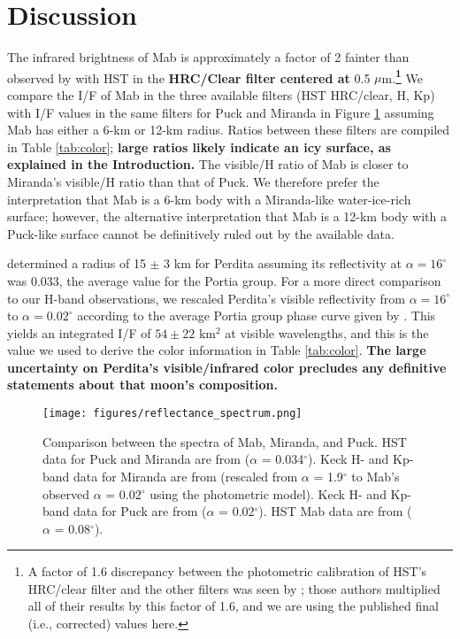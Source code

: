 \documentclass[preprint]{aastex631}
\begin{document}
\section{Discussion}
\label{s:discussion}

The infrared brightness of Mab is approximately a factor of 2 fainter than observed by \citet{showalter06} with HST in the \textbf{HRC/Clear filter centered at} 0.5 $\mu$m.\textbf{\footnote{A factor of 1.6 discrepancy between the photometric calibration of HST's HRC/clear filter and the other filters was seen by \citet{showalter06}; those authors multiplied all of their results by this factor of 1.6, and we are using the published final (i.e., corrected) values here.}} We compare the I/F of Mab in the three available filters (HST HRC/clear, H, Kp) with I/F values in the same filters for Puck and Miranda \citep{karkoschka01, gibbard05, paradis23} in Figure \ref{fig:spectrum} assuming Mab has either a 6-km or 12-km radius. Ratios between these filters are compiled in Table \ref{tab:color}; \textbf{large ratios likely indicate an icy surface, as explained in the Introduction.} 
The visible/H ratio of Mab is 
closer to Miranda's visible/H ratio than that of Puck. We therefore prefer the interpretation that Mab is a 6-km body with a Miranda-like water-ice-rich surface; however, the alternative interpretation that Mab is a 12-km body with a Puck-like surface cannot be definitively ruled out by the available data.


\citet{karkoschka01b} determined a radius of 15 $\pm$ 3 km for Perdita assuming its reflectivity at $\alpha=16^\circ$ was 0.033, the average value for the Portia group. For a more direct comparison to our H-band observations, we rescaled Perdita's visible reflectivity from $\alpha = 16^\circ$ to $\alpha = 0.02^\circ$ according to the average Portia group phase curve given by \citet{karkoschka01}. This yields an integrated I/F of $54 \pm 22$ km$^2$ at visible wavelengths, and this is the value we used to derive the color information in Table \ref{tab:color}. \textbf{The large uncertainty on Perdita's visible/infrared color precludes any definitive statements about that moon's composition.}


\begin{figure}
\texttt{[image: figures/reflectance\_spectrum.png]}
\caption{Comparison between the spectra of Mab, Miranda, and Puck. HST data for Puck and Miranda are from \citet{karkoschka01} ($\alpha$ = 0.034$^\circ$). Keck H- and Kp-band data for Miranda are from \citet{gibbard05} (rescaled from $\alpha$ = 1.9$^\circ$ to Mab's observed $\alpha$ = 0.02$^\circ$ using the \citet{karkoschka01} photometric model). Keck H- and Kp-band data for Puck are from \citet{paradis23} ($\alpha$ = 0.02$^\circ$). HST Mab data are from \citet{showalter06} ($\alpha$ = 0.08$^\circ$).}
\label{fig:spectrum}
\end{figure}
\end{document}
